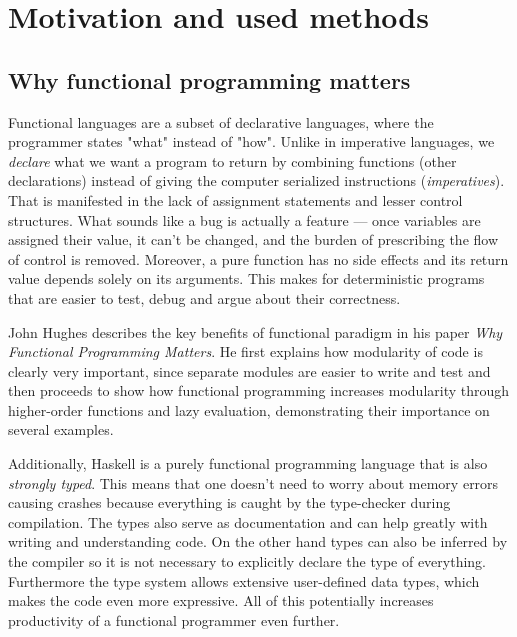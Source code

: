 \documentclass[
  digital, %
  color,   %
  table,   %
  oneside, %
  lof,     %
  lot,     %
]{fithesis3}
\begin{document}
\chapter{Motivation and used methods}


\section{Why functional programming matters}
\label{sect:whyfpmatters}

Functional languages are a subset of declarative languages, where the
programmer states "what" instead of "how". Unlike in imperative languages,
we \emph{declare} what we want a program to return by combining functions (other declarations)
instead of giving the computer serialized instructions (\emph{imperatives}).
That is manifested in the lack of assignment statements and lesser control structures.
What sounds like a bug is actually a feature --- once variables are assigned
their value, it can't be changed, and the burden of prescribing the flow of control
is removed\cite{whyfpmatters}. Moreover, a pure function has no side effects
and its return value depends solely on its arguments. This makes for deterministic
programs that are easier to test, debug and argue about their correctness.

John Hughes describes the key benefits of functional paradigm in his paper
\textit{Why Functional Programming Matters}\cite{whyfpmatters}. He first
explains how modularity of code is clearly very important, since
separate modules are easier to write and test and then proceeds
to show how functional programming increases modularity
through higher-order functions and lazy evaluation, demonstrating
their importance on several examples.

Additionally, Haskell is a purely functional programming language that
is also \emph{strongly typed}. This means that one
doesn't need to worry about memory errors causing crashes because
everything is caught by the type-checker during compilation.
The types also serve as documentation and can help greatly
with writing and understanding code. On the other hand
types can also be inferred by the compiler so it
is not necessary to explicitly declare the type of everything.
Furthermore the type system allows extensive user-defined data types,
which makes the code even more expressive.
All of this potentially increases productivity of a functional programmer even further.
\end{document}
